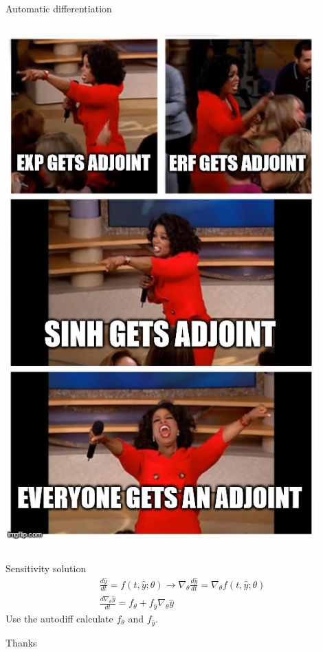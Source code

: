 \documentclass[bigger]{beamer}
\begin{document}
\begin{frame}[label={sec:org891314f}]{Automatic differentiation}
\begin{columns}
\begin{column}{0.5\columnwidth}
\begin{center}
\includegraphics[width=0.9\textwidth]{./figure/everyone_adjoint.jpg}
\end{center}
\end{column}
\end{columns}
\end{frame}

\begin{frame}[label={sec:org70212c5}]{Sensitivity solution}
\begin{align*}
  &\frac{d\hat{y}}{dt} = f(t, \hat{y};\theta) \rightarrow \nabla_{\theta} \frac{d\hat{y}}{dt} = \nabla_{\theta} f(t, \hat{y};\theta)\\
  &\frac{d\nabla_{\theta} \hat{y}}{dt} = f_{\theta} + f_{\hat{y}}\nabla_{\theta}\hat{y}
\end{align*}
Use the autodiff calculate \(f_{\theta}\) and \(f_{\hat{y}}\).
\end{frame}


\begin{frame}[label={sec:orgc105ae9}]{Thanks}
\end{frame}
\end{document}
